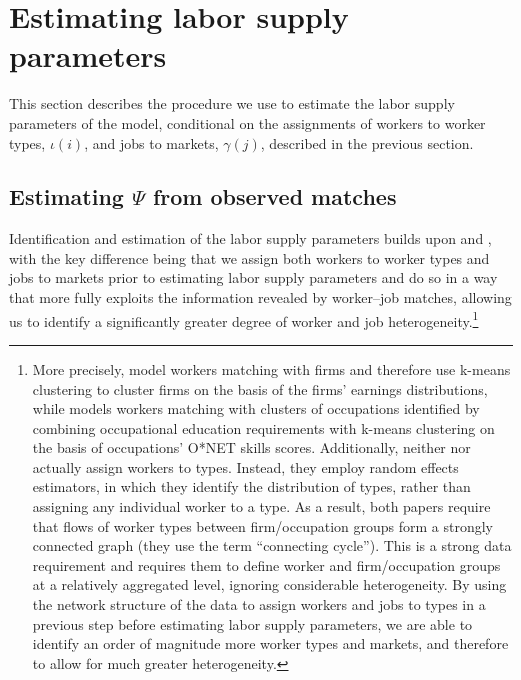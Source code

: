 \documentclass[12pt]{article}
\def\g{\gamma}
\def\i{\iota}
\theoremstyle{definition}
\theoremstyle{plain}
\begin{document}

\section{Estimating labor supply parameters}
\label{sec:MLE}

This section describes the procedure we use to estimate the labor supply parameters of the model, conditional on the assignments of workers to worker types, $\i(i)$, and jobs to markets, $\g(j)$, described in the previous section.


\subsection{Estimating $\Psi$ from observed matches}

\label{sec:estimating_psi}


Identification and estimation of the labor supply parameters builds upon  \citet{BonhommeLamadonManresa2019_distributional} and \citet{Grigsby2019}, with the key difference being that we assign both workers to worker types and jobs to markets prior to estimating labor supply parameters and do so in a way that more fully exploits the information revealed by worker--job matches, allowing us to identify a significantly greater degree of worker and job heterogeneity.\footnote{More precisely, \citet{BonhommeLamadonManresa2019_distributional} model workers matching with firms and therefore use k-means clustering to cluster firms on the basis of the firms' earnings distributions, while \citet{Grigsby2019} models workers matching with clusters of occupations identified by combining occupational education requirements with k-means clustering on the basis of occupations' O*NET skills scores. Additionally, neither \citet{BonhommeLamadonManresa2019_distributional} nor \citet{Grigsby2019} actually assign workers to types. Instead,  they employ random effects estimators, in which they identify the distribution of types, rather than assigning any individual worker to a type. As a result, both papers require that flows of worker types between firm/occupation groups form a strongly connected graph (they use the term ``connecting cycle''). This is a strong data requirement and requires them to define worker and firm/occupation groups at a relatively aggregated level, ignoring considerable heterogeneity. By using the network structure of the data to assign workers and jobs to types in a previous step before estimating labor supply parameters, we are able to identify an order of magnitude more worker types and markets, and therefore to allow for much greater heterogeneity.} 
\end{document}
